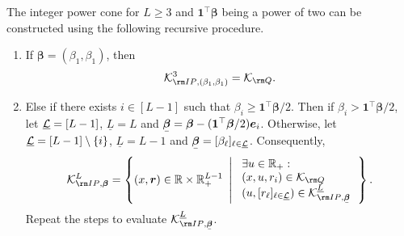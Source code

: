 \documentclass[mnsc, nonblindrev]{informswp}
\newcommand{\1}[1]{\mathds{1}{\left(#1\right)}}
\begin{document}
\begin{appendices}
\begin{theorem}
\label{thm:IntegerPowerConvert}
The integer power cone for $L\geq 3$ and $\bm 1^\top \bm \beta$ being a power of two can be constructed using the following recursive procedure.
\begin{enumerate}[Step 1.]

\item If  $\bm \beta = (\beta_1, \beta_1)$, then
$$
\cK^{3}_{{\rm IP},(\beta_1,\beta_1)} =   \cK_{
\rm Q}.  
$$

\item Else if there exists $i \in [L-1]$ such that $\beta_i \geq \bm 1^\top \bm \beta/2$. Then if $\beta_i >  \bm 1^\top \bm \beta/2$, let $\underline {\mathcal{L}} = [L-1]$, $\underline L = L$ and $\bmu \beta =\bm \beta - (\bm 1^\top \bm \beta/2)\bm e_i$. Otherwise, let $\underline {\mathcal{L}} = [L-1]\setminus\{i\}$, $\underline L = L-1$ and  $\bmu \beta = [\beta_\ell]_{\ell \in \underline \cL}$. Consequently, 
$$
\cK^{L}_{{\rm IP},\bm \beta} = \left\{ (x,\bm r) \in \bbr\times \bbr^{L-1}_+ ~\left|~ 
\begin{array}{ll} \exists u \in \bbr_+: \\
(x,u,r_i) \in \cK_{{\rm Q}} \\
(u, [r_\ell]_{\ell \in \underline \cL}) \in \cK^{\underline L}_{{\rm IP},\bmu \beta} \\
\end{array}
\right.\right\}.
$$
Repeat the steps to evaluate $\cK^{\underline L}_{{\rm IP},\bmu \beta}$.


\end{enumerate}
\end{theorem}
\end{appendices}
\end{document}
